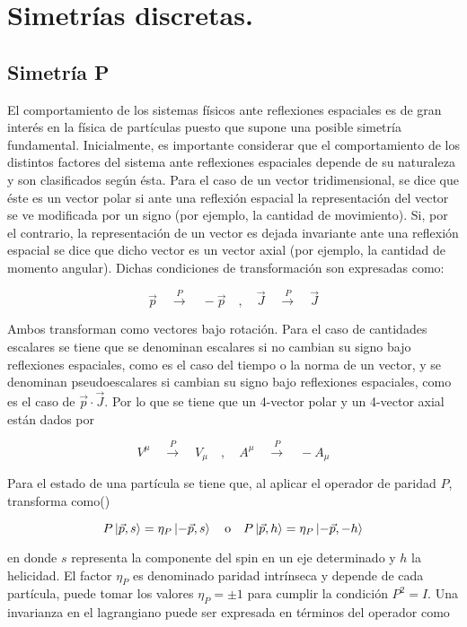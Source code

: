 \section{Simetrías discretas.}

\subsection{Simetría P}

El comportamiento de los sistemas físicos ante reflexiones espaciales es de gran interés en la física de partículas puesto que supone una posible simetría fundamental. Inicialmente, es importante considerar que el comportamiento de los distintos factores del sistema ante reflexiones espaciales depende de su naturaleza y son clasificados según ésta. Para el caso de un vector tridimensional, se dice que éste es un vector polar si ante una reflexión espacial la representación del vector se ve modificada por un signo (por ejemplo, la cantidad de movimiento). Si, por el contrario, la representación de un vector es dejada invariante ante una reflexión espacial se dice que dicho vector es un vector axial (por ejemplo, la cantidad de momento angular). Dichas condiciones de transformación son expresadas como:

$$ \vec{p} \quad \xrightarrow{P} \quad -\vec{p} \quad , \quad \vec{J} \quad \xrightarrow{P} \quad \vec{J} $$

Ambos transforman como vectores bajo rotación. Para el caso de cantidades escalares se tiene que se denominan escalares si no cambian su signo bajo reflexiones espaciales, como es el caso del tiempo o la norma de un vector, y se denominan pseudoescalares si cambian su signo bajo reflexiones espaciales, como es el caso de $\vec{p}\cdot \vec{J}$. Por lo que se tiene que un 4-vector polar y un 4-vector axial están dados por

$$ V^{\mu} \quad \xrightarrow{P} \quad V_{\mu} \quad , \quad A^{\mu} \quad \xrightarrow{P} \quad -A_{\mu} $$

Para el estado de una partícula se tiene que, al aplicar el operador de paridad $P$, transforma como(\cite{langacker2017standard})

$$ P\ket{\vec{p},s} = \eta_P \ket{-\vec{p}, s} \quad \text{o} \quad P\ket{\vec{p},h} = \eta_P \ket{-\vec{p}, -h} $$

en donde $s$ representa la componente del spin en un eje determinado y $h$ la helicidad. El factor $\eta_P$ es denominado paridad intrínseca y depende de cada partícula, puede tomar los valores $\eta_P =\pm 1$ para cumplir la condición $P^2=I$. Una invarianza en el lagrangiano puede ser expresada en términos del operador como

